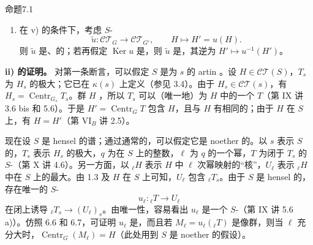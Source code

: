\begin{SGAresult}{命题}{7.1}
\begin{enumerate}
\item[vi)] 在 v) 的条件下，考虑 $S$-
\[\widetilde u:\mathcal{CT}_G\longrightarrow\mathcal{CT}_{G'},\qquad H\longmapsto H'=u(H).\]
则 $\widetilde u$ 是、的；若再假定 $\operatorname{Ker}u$ 是，则 $\widetilde u$ 是，其逆为 $H'\mapsto u^{-1}(H')$。
\end{enumerate}
\end{SGAresult}
\textbf{ii) 的证明。} 对第一条断言，可以假定 $S$ 是为 $s$ 的 artin 。设 $H\in\mathcal{CT}(S)$，$T_s$ 为 $H_s$ 的极大；它已在 $\kappa(s)$ 上定义（参见 3.4）。由于 $H_s\in\mathcal{CT}(s)$，有 $H_s=\operatorname{Centr}_{G_s}T_s$。群 $H$ ，所以 $T_s$ 可以（唯一地）为 $H$ 中的一个 $T$（第 IX 讲 3.6 bis 和 5.6）。于是 $H'=\operatorname{Centr}_G T$ 包含 $H$，且与 $H$ 有相同的；由于 $H$ 在 $S$ 上，有 $H=H'$（第 VI$_B$ 讲 2.5）。

现在设 $S$ 是 hensel 的谱；通过通常的，可以假定它是 noether 的。以 $s$ 表示 $S$ 的，$T_s$ 表示 $H_s$ 的极大，$q$ 为在 $S$ 上的整数，$\ell$ 为 $q$ 的一个幂，$T$ 为闭于 $T_s$ 的 $S$-（第 X 讲 4.6）。另一方面，以 ${}_\ell H$ 表示 $H$ 中 $\ell$ 次幂映射的“核”，$U_\ell$ 表示 ${}_\ell H$ 中在 $S$ 上的最大。由 1.3 及 $H$ 在 $S$ 上可知，$U_\ell$ 包含 ${}_\ell T_s$。由于 $S$ 是 hensel 的，存在唯一的 $S$-
\[u_\ell:{}_\ell T\longrightarrow U_\ell\]
在闭上诱导 ${}_\ell T_s\to(U_\ell)_s$。由唯一性，容易看出 $u_\ell$ 是一个 $S$-（第 IX 讲 5.6 a)）。仿照 6.6 和 6.7，可证明 $u_\ell$ 是，而且若 $M_\ell=u_\ell({}_\ell T)$ 是像群，则当 $\ell$ 充分大时，$\operatorname{Centr}_G(M_\ell)=H$（此处用到 $S$ 是 noether 的假设）。

